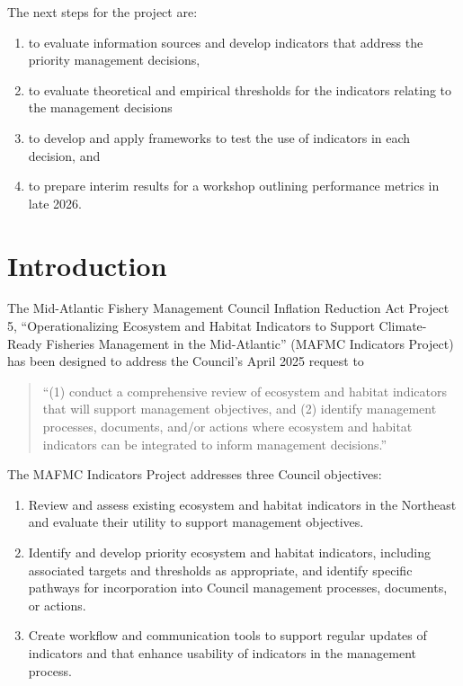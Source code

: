 \documentclass[
]{article}
\providecommand{\tightlist}{%
  \setlength{\itemsep}{0pt}\setlength{\parskip}{0pt}}
\begin{document}
The next steps for the project are:

\begin{enumerate}
\def\labelenumi{\arabic{enumi}.}
\tightlist
\item
  to evaluate information sources and develop indicators that address the priority management decisions,
\item
  to evaluate theoretical and empirical thresholds for the indicators relating to the management decisions
\item
  to develop and apply frameworks to test the use of indicators in each decision, and
\item
  to prepare interim results for a workshop outlining performance metrics in late 2026.
\end{enumerate}

\section{Introduction}\label{introduction}

The Mid-Atlantic Fishery Management Council Inflation Reduction Act Project 5, ``Operationalizing Ecosystem and Habitat Indicators to Support Climate-Ready Fisheries Management in the Mid-Atlantic'' (MAFMC Indicators Project) has been designed to address the Council's April 2025 request to

\begin{quote}
``(1) conduct a comprehensive review of ecosystem and habitat indicators that will support management objectives, and (2) identify management processes, documents, and/or actions where ecosystem and habitat indicators can be integrated to inform management decisions.''
\end{quote}

The MAFMC Indicators Project addresses three Council objectives:

\begin{enumerate}
\def\labelenumi{\arabic{enumi}.}
\tightlist
\item
  Review and assess existing ecosystem and habitat indicators in the Northeast and evaluate their utility to support management objectives.
\item
  Identify and develop priority ecosystem and habitat indicators, including associated targets and thresholds as appropriate, and identify specific pathways for incorporation into Council management processes, documents, or actions.
\item
  Create workflow and communication tools to support regular updates of indicators and that enhance usability of indicators in the management process.
\end{enumerate}
\end{document}
